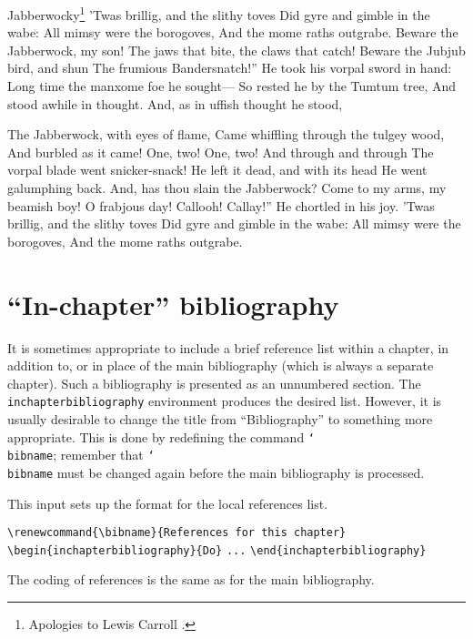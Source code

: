 \documentclass[multixcb]{amstext-l}
\theoremstyle{plain}
\theoremstyle{definition}
\newcommand{\cs}[1]{\texttt{\char`\\#1}}
\newenvironment{exm}{%
  \par
  \begingroup
    \parindent0pt
    \leftskip2\normalparindent
    \obeylines
}{%
    \par
  \endgroup
}
\begin{document}
\begin{inclusion}{Jabberwocky\footnote{Apologies to
  Lewis Carroll \cite{Do}.}}
\obeylines\parindent=0pt
'Twas brillig, and the slithy toves
  Did gyre and gimble in the wabe:
All mimsy were the borogoves,
  And the mome raths outgrabe.
\null
\leavevmode{}Beware the Jabberwock, my son!
  The jaws that bite, the claws that catch!
Beware the Jubjub bird, and shun
  The frumious Bandersnatch!''
\null
He took his vorpal sword in hand:
  Long time the manxome foe he sought---
So rested he by the Tumtum tree,
  And stood awhile in thought.
\null
And, as in uffish thought he stood,\par\nobreak
  The Jabberwock, with eyes of flame,
Came whiffling through the tulgey wood,
  And burbled as it came!
\null
One, two! One, two! And through and through
  The vorpal blade went snicker-snack!
He left it dead, and with its head
  He went galumphing back.
\null
\leavevmode{}And, has thou slain the Jabberwock?
  Come to my arms, my beamish boy!
O frabjous day! Callooh! Callay!''
  He chortled in his joy.
\null
'Twas brillig, and the slithy toves
  Did gyre and gimble in the wabe:
All mimsy were the borogoves,
  And the mome raths outgrabe.
\end{inclusion}

\section{``In-chapter'' bibliography}

It is sometimes appropriate to include a brief reference list within
a chapter, in addition to, or in place of the main bibliography (which
is always a separate chapter).  Such a bibliography is presented as
an unnumbered section.  The \texttt{inchapterbibliography} environment
produces the desired list.  However, it is usually desirable to change
the title from ``Bibliography'' to something more appropriate.  This
is done by redefining the command \cs{bibname}; remember that
\cs{bibname} must be changed again before the main bibliography
is processed.

This input sets up the format for the local references list.
\begin{exm}
\verb+\renewcommand{\bibname}{References for this chapter}+
\verb+\begin{inchapterbibliography}{Do}+
\verb+...+
\verb+\end{inchapterbibliography}+
\end{exm}
\noindent
The coding of references is the same as for the main bibliography.
\end{document}

